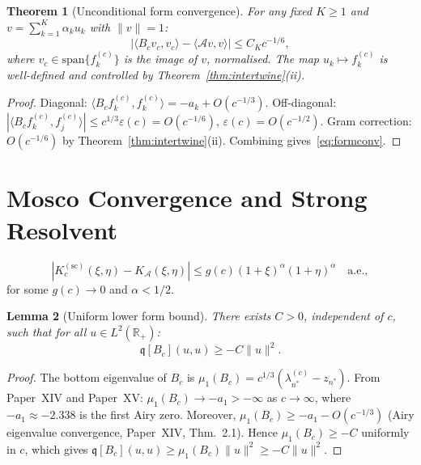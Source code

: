 \documentclass[12pt,a4paper]{amsart}
\newtheorem{theorem}{Theorem}[section]
\newtheorem{lemma}[theorem]{Lemma}
\theoremstyle{definition}
\newcommand{\cA}{\mathcal{A}}
\newcommand{\lam}[2]{\lambda_{#2}^{(#1)}}
\newcommand{\norm}[1]{\|#1\|}
\newcommand{\R}{\mathbb{R}}
\begin{document}
\begin{theorem}[Unconditional form convergence]
\label{thm:formconv}
For any fixed $K\geq 1$ and
$v=\sum_{k=1}^K\alpha_k u_k$ with $\norm{v}=1$:
\begin{equation}\label{eq:formconv}
  |\langle B_cv_c,v_c\rangle - \langle\cA v,v\rangle|
  \leq C_K c^{-1/6},
\end{equation}
where $v_c\in\mathrm{span}\{f_k^{(c)}\}$ is the image of $v$,
normalised. The map $u_k\mapsto f_k^{(c)}$ is well-defined
and controlled by Theorem~\ref{thm:intertwine}(ii).
\end{theorem}

\begin{proof}
Diagonal: $\langle B_cf_k^{(c)},f_k^{(c)}\rangle = -a_k+O(c^{-1/3})$.
Off-diagonal: $|\langle B_cf_k^{(c)},f_j^{(c)}\rangle|
\leq c^{1/3}\varepsilon(c) = O(c^{-1/6})$, $\varepsilon(c)=O(c^{-1/2})$.
Gram correction: $O(c^{-1/6})$ by Theorem~\ref{thm:intertwine}(ii).
Combining gives~\eqref{eq:formconv}.
\end{proof}

\section{Mosco Convergence and Strong Resolvent}
\label{sec:strongres}

\begin{assumption}
\label{ass:kernelrate}
\begin{equation}\label{eq:kernelrate}
  |K_c^{(\mathrm{sc})}(\xi,\eta) - K_{\cA}(\xi,\eta)|
  \leq g(c)(1+\xi)^\alpha(1+\eta)^\alpha
  \quad\text{a.e.},
\end{equation}
for some $g(c)\to 0$ and $\alpha<1/2$.
\end{assumption}

\begin{lemma}[Uniform lower form bound]
\label{lem:uniformlower}
There exists $C>0$, independent of $c$, such that for all $u\in L^2(\R_+)$:
\begin{equation}\label{eq:uniformlower}
  \mathfrak{q}[B_c](u,u) \geq -C\norm{u}^2.
\end{equation}
\end{lemma}

\begin{proof}
The bottom eigenvalue of $B_c$ is
$\mu_1(B_c) = c^{1/3}(\lam{c}{n^*} - z_{n^*})$.
From Paper~XIV and Paper~XV:
$\mu_1(B_c) \to -a_1 > -\infty$ as $c\to\infty$,
where $-a_1 \approx -2.338$ is the first Airy zero.
Moreover, $\mu_1(B_c) \geq -a_1 - O(c^{-1/3})$
(Airy eigenvalue convergence, Paper~XIV, Thm.~2.1).
Hence $\mu_1(B_c)\geq -C$ uniformly in $c$, which gives
$\mathfrak{q}[B_c](u,u)\geq \mu_1(B_c)\norm{u}^2\geq -C\norm{u}^2$.
\end{proof}
\end{document}
